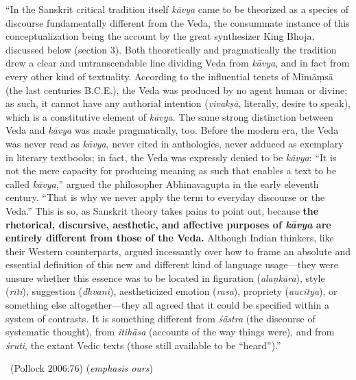 \begin{myquote}
“In the Sanskrit critical tradition itself \textit{kāvya} came to be theorized as a species of discourse fundamentally different from the Veda, the consummate instance of this conceptualization being the account by the great synthesizer King Bhoja, discussed below (section 3). Both theoretically and pragmatically the tradition drew a clear and untranscendable line dividing Veda from \textit{kāvya}, and in fact from every other kind of textuality. According to the influential tenets of Mīmāṃsā (the last centuries B.C.E.), the Veda was produced by no agent human or divine; as such, it cannot have any authorial intention (\textit{vivakṣā}, literally, desire to speak), which is a constitutive element of \textit{kāvya}. The same strong distinction between Veda and \textit{kāvya} was made pragmatically, too. Before the modern era, the Veda was never read as \textit{kāvya}, never cited in anthologies, never adduced as exemplary in literary textbooks; in fact, the Veda was expressly denied to be \textit{kāvya}: “It is not the mere capacity for producing meaning as such that enables a text to be called \textit{kāvya},” argued the philosopher Abhinavagupta in the early eleventh century. “That is why we never apply the term to everyday discourse or the Veda.” This is so, as Sanskrit theory takes pains to point out, because \textbf{the rhetorical, discursive, aesthetic, and affective purposes of \textit{kāvya} are entirely different from those of the Veda.} Although Indian thinkers, like their Western counterparts, argued incessantly over how to frame an absolute and essential definition of this new and different kind of language usage—they were unsure whether this essence was to be located in figuration (\textit{alaṇkāra}), style (\textit{rīti}), suggestion (\textit{dhvani}), aestheticized emotion (\textit{rasa}), propriety (\textit{aucitya}), or something else altogether—they all agreed that it could be specified within a system of contrasts. It is something different from \textit{śāstra} (the discourse of systematic thought), from \textit{itihāsa} (accounts of the way things were), and from \textit{śruti}, the extant Vedic texts (those still available to be “heard”).” 

~\hfill (Pollock 2006:76) (\textit{emphasis ours})
\end{myquote}

